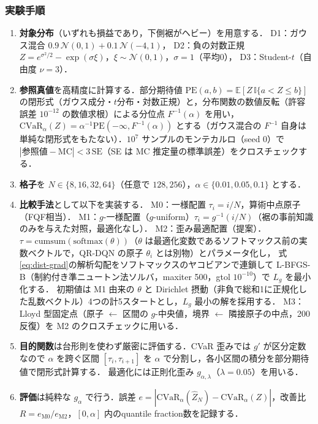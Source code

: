 \documentclass[a4paper,10pt]{jsarticle}
\theoremstyle{definition}
\newcommand{\CVaR}{\mathrm{CVaR}}
\newcommand{\Finv}{F^{-1}}
\newcommand{\E}{\mathbb{E}}
\begin{document}
\subsubsection{実験手順}
\begin{enumerate}
  \item \textbf{対象分布}（いずれも損益であり，下側裾がヘビー）を用意する．
  D1：ガウス混合 $0.9\,\mathcal N(0,1)+0.1\,\mathcal N(-4,1)$，
  D2：負の対数正規 $Z=e^{\sigma^2/2}-\exp(\sigma\xi)$，$\xi\sim\mathcal N(0,1)$，$\sigma=1$（平均0），
  D3：Student-$t$（自由度 $\nu=3$）．
  \item \textbf{参照真値}を高精度に計算する．部分期待値 $\mathrm{PE}(a,b)=\E[Z\,\mathbb{I}\{a<Z\le b\}]$ の閉形式（ガウス成分・$t$分布・対数正規）と，分布関数の数値反転（許容誤差 $10^{-12}$ の数値求根）による分位点 $\Finv(\alpha)$ を用い，
  $\CVaR_\alpha(Z)=\alpha^{-1}\mathrm{PE}(-\infty,\Finv(\alpha))$ とする（ガウス混合の $\Finv$ 自身は単純な閉形式をもたない）．$10^7$ サンプルのモンテカルロ（seed 0）で $|\text{参照値}-\text{MC}|<3\,\mathrm{SE}$（SE は MC 推定量の標準誤差）をクロスチェックする．
  \item \textbf{格子}を $N\in\{8,16,32,64\}$（任意で $128,256$），$\alpha\in\{0.01,0.05,0.1\}$ とする．
  \item \textbf{比較手法}として以下を実装する．
  M0：一様配置 $\tau_i=i/N$，算術中点原子（FQF相当）．
  M1：$g$-一様配置（$g$-uniform）$\tau_i=g^{-1}(i/N)$（裾の事前知識のみを与えた対照，最適化なし）．
  M2：歪み最適配置（提案）．$\tau=\mathrm{cumsum}(\mathrm{softmax}(\theta))$（$\theta$ は最適化変数であるソフトマックス前の実数ベクトルで，QR-DQN の原子 $\theta_i$ とは別物）とパラメータ化し，
  式\eqref{eq:dist-grad}の解析勾配をソフトマックスのヤコビアンで連鎖して L-BFGS-B（制約付き準ニュートン法ソルバ，maxiter 500，gtol $10^{-10}$）で $L_g$ を最小化する．
  初期値は M1 由来の $\theta$ と Dirichlet 摂動（非負で総和1に正規化した乱数ベクトル）4つの計5スタートとし，$L_g$ 最小の解を採用する．
  M3：Lloyd 型固定点（原子 $\leftarrow$ 区間の $g$-中央値，境界 $\leftarrow$ 隣接原子の中点，200反復）を M2 のクロスチェックに用いる．
  \item \textbf{目的関数}は台形則を使わず厳密に評価する．CVaR 歪みでは $g'$ が区分定数なので $\alpha$ を跨ぐ区間 $[\tau_i,\tau_{i+1}]$ を $\alpha$ で分割し，各小区間の積分を部分期待値で閉形式計算する．
  最適化には正則化歪み $g_{\alpha,\lambda}$（$\lambda=0.05$）を用いる．
  \item \textbf{評価}は純粋な $g_\alpha$ で行う．誤差 $e=|\CVaR_\alpha(\hat Z_N)-\CVaR_\alpha(Z)|$，改善比 $R=e_{\mathrm{M0}}/e_{\mathrm{M2}}$，$[0,\alpha]$ 内のquantile fraction数を記録する．

\end{enumerate}
\end{document}

